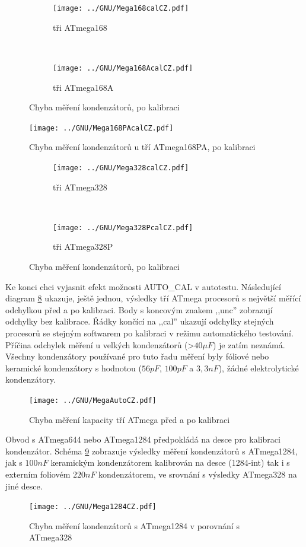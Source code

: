 \begin{figure}[H]
  \begin{subfigure}[b]{.5\textwidth}
    \centering
    \texttt{[image: ../GNU/Mega168calCZ.pdf]}
    \caption{tři ATmega168}
    \label{fig:mega168cal}
  \end{subfigure}
  ~
  \begin{subfigure}[b]{.5\textwidth}
    \centering
    \texttt{[image: ../GNU/Mega168AcalCZ.pdf]}
    \caption{tři ATmega168A}
    \label{fig:mega168Acal}
  \end{subfigure}
  \caption{Chyba měření kondenzátorů, po kalibraci}
\end{figure}

\begin{figure}[H]
\centering
\texttt{[image: ../GNU/Mega168PAcalCZ.pdf]}
\caption{Chyba měření kondenzátorů u tří ATmega168PA, po kalibraci}
\label{fig:mega168PAcal}
\end{figure}

\begin{figure}[H]
  \begin{subfigure}[b]{.5\textwidth}
    \centering
    \texttt{[image: ../GNU/Mega328calCZ.pdf]}
    \caption{tři ATmega328}
    \label{fig:mega328cal}
  \end{subfigure}
  ~
  \begin{subfigure}[b]{.5\textwidth}
    \centering
    \texttt{[image: ../GNU/Mega328PcalCZ.pdf]}
    \caption{tři ATmega328P}
    \label{fig:mega328Pcal}
  \end{subfigure}
  \caption{Chyba měření kondenzátorů, po kalibraci}
\end{figure}

Ke konci chci vyjasnit efekt možnosti AUTO\_CAL v autotestu.
Následující diagram \ref{fig:MegaAuto} ukazuje, ještě jednou, výsledky tří ATmega procesorů
s největší měřící odchylkou před a po kalibraci.
Body s koncovým znakem ,,unc'' zobrazují odchylky bez kalibrace.
Řádky končící na ,,cal'' ukazují odchylky stejných procesorů
se stejným softwarem po kalibraci v režimu automatického testování.
Příčina odchylek měření u velkých kondenzátorů (\textgreater\(40\mu F\))  je
zatím neznámá.\\ Všechny kondenzátory používané pro tuto řadu měření byly
fóliové nebo keramické kondenzátory s hodnotou (\(56pF\), \(100pF\) a \(3,3nF\)),
žádné elektrolytické kondenzátory.

\begin{figure}[H]
\centering
\texttt{[image: ../GNU/MegaAutoCZ.pdf]}
\caption{Chyba měření kapacity tří ATmega před a po kalibraci}
\label{fig:MegaAuto}
\end{figure}

Obvod s ATmega644 nebo ATmega1284 předpokládá na desce pro kalibraci kondenzátor.
Schéma \ref{fig:Mega1284} zobrazuje výsledky měření kondenzátorů s ATmega1284,
jak s \(100nF\)  keramickým kondenzátorem kalibrován na desce (1284-int) tak i s externím
foliovém \(220nF\) kondenzátorem,
ve srovnání s výsledky ATmega328 na jiné desce.

\begin{figure}[H]
\centering
\texttt{[image: ../GNU/Mega1284CZ.pdf]}
\caption{Chyba měření kondenzátorů s ATmega1284 v porovnání s ATmega328}
\label{fig:Mega1284}
\end{figure}
